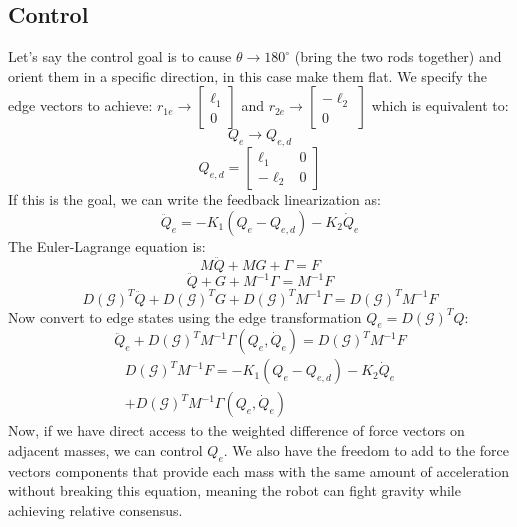 \documentclass[conference]{IEEEtran}
\begin{document}
\subsection{Control}

Let's say the control goal is to cause $\theta\rightarrow180^\circ$ (bring the two rods together) and orient them in a specific direction, in this case make them flat. We specify the edge vectors to achieve: $r_{1e}\rightarrow\begin{bmatrix}
    \ell_1\\ 0
\end{bmatrix}$ and $r_{2e}\rightarrow\begin{bmatrix}
    -\ell_2\\ 0
\end{bmatrix}$ which is equivalent to:
$$Q_e\rightarrow Q_{e,d}$$
\begin{equation} \label{eq:Qe}
    Q_{e,d}=\begin{bmatrix}
        \ell_1 & 0\\
        -\ell_2 & 0
    \end{bmatrix}
\end{equation}
If this is the goal, we can write the feedback linearization as:
$$\ddot{Q}_e=-K_1\left(Q_e-Q_{e,d}\right)-K_2\dot{Q}_e$$
The Euler-Lagrange equation is:
$$M\ddot{Q}+MG+\Gamma=F$$
$$\ddot{Q}+G+M^{-1}\Gamma=M^{-1}F$$
$$D(\mathcal{G})^T\ddot{Q}+D(\mathcal{G})^TG+D(\mathcal{G})^TM^{-1}\Gamma=D(\mathcal{G})^TM^{-1}F$$
Now convert to edge states using the edge transformation $Q_e=D(\mathcal{G})^TQ$:
$$\ddot{Q}_e+D(\mathcal{G})^TM^{-1}\Gamma(Q_e, \dot{Q}_e)=D(\mathcal{G})^TM^{-1}F$$
\begin{multline} \label{eq:2}
    D(\mathcal{G})^TM^{-1}F=-K_1\left(Q_e-Q_{e,d}\right)-K_2\dot{Q}_e\\+D(\mathcal{G})^TM^{-1}\Gamma(Q_e, \dot{Q}_e)
\end{multline}
Now, if we have direct access to the weighted difference of force vectors on adjacent masses, we can control $Q_e$. We also have the freedom to add to the force vectors components that provide each mass with the same amount of acceleration without breaking this equation, meaning the robot can fight gravity while achieving relative consensus.
\end{document}
